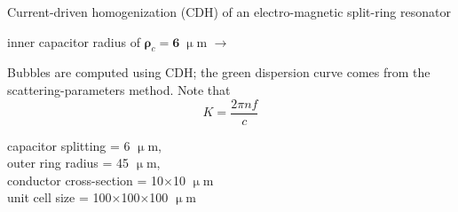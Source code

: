 \documentclass[t]{beamer} \usepackage[english]{babel} \usepackage[utf8]{inputenc} \usetheme{Frankfurt} %
\begin{document}
\begin{frame}[plain]{}%
\begin{columns}[T] %
	\begin{column}{.55\textwidth}
	\vspace{3mm}
	\noindent Current-driven homogenization (CDH) of an electro-magnetic split-ring resonator 
	\begin{exampleblock}\hfill inner capacitor radius of $\pmb\rho_c=\pmb{6}\;\upmu$m $\rightarrow$\end{exampleblock}
	\vspace{3mm}

	\noindent Bubbles are computed using CDH; the green dispersion curve comes from the scattering-parameters method. Note that $$K = \frac{2\pi n f}{c}$$
	\vspace{12mm}

	\small{capacitor splitting = 6 $\upmu$m,\\ outer ring radius = 45 $\upmu$m,\\ conductor cross-section = 10$\times$10 $\upmu$m\\ unit cell size = 100$\times$100$\times$100 $\upmu$m}


\end{column}
\end{columns}
\end{frame}
\end{document}
